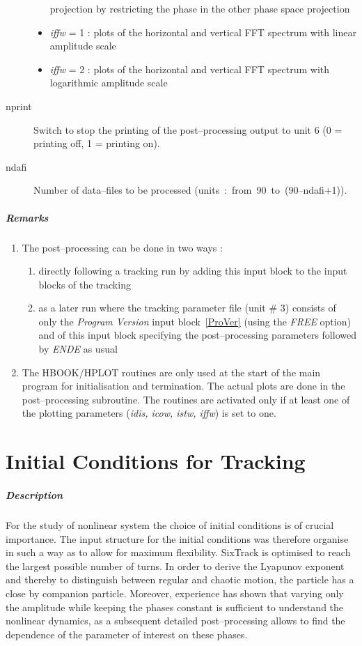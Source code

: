 \begin{description}
\begin{itemize}
    projection by restricting the phase in the other phase space
    projection
  \item {\em iffw} \/= 1 : plots of the horizontal and vertical FFT
    spectrum with linear amplitude scale
  \item {\em iffw} \/= 2 : plots of the horizontal and vertical FFT
    spectrum with logarithmic amplitude scale
  \end{itemize}
\item [nprint] Switch to stop the printing of the post--processing
  output to unit 6 (0 = printing off, 1 = printing on).
\item [ndafi] Number of data--files to be processed \mbox{(units :
    from 90 to (90--ndafi+1)\hspace{3mm}).}
\end{description}

\subparagraph{Remarks}
\begin{enumerate}
\item The post--processing can be done in two ways :
\begin{enumerate}
\item directly following a tracking run by adding this input block to
  the input blocks of the tracking
\item as a later run where the tracking parameter file (unit \# 3)
  consists of only the {\em Program Version} \/input
  block~\ref{ProVer} (using the {\em FREE} \/option) and of this input
  block specifying the post--processing parameters followed by {\em
    ENDE} \/as usual
\end{enumerate}
\item The HBOOK/HPLOT routines are only used at the start of the main
  program for initialisation and termination. The actual plots are
  done in the post--processing subroutine. The routines are activated
  only if at least one of the plotting parameters ({\em idis, icow,
    istw, iffw}\/) is set to one.
\end{enumerate}

\section{Initial Conditions for Tracking}

\subparagraph{Description} For the study of nonlinear system the
choice of initial conditions is of crucial importance. The input
structure for the initial conditions was therefore organise in such a
way as to allow for maximum flexibility. SixTrack is optimised to
reach the largest possible number of turns. In order to derive the
Lyapunov exponent and thereby to distinguish between regular and
chaotic motion, the particle has a close by companion particle.
Moreover, experience has shown that varying only the amplitude while
keeping the phases constant is sufficient to understand the nonlinear
dynamics, as a subsequent detailed post--processing allows to find the
dependence of the parameter of interest on these phases.

